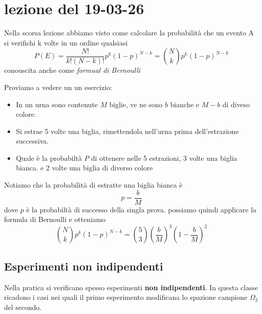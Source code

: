\documentclass[11pt,a4paper]{article}
\begin{document}
\section{lezione del 19-03-26}
Nella scorsa lezione abbiamo visto come calcolare la probabilità che un evento A 
si verifichi k volte in un ordine qualsiasi
\[
    P(E) = \frac{N!}{k!(N - k)!}p^k(1 - p)^{N - k} = \binom{N}{k}p^k(1 - p)^{N - k}
\]
conouscita anche come \textit{formual di Bernoulli}

Proviamo a vedere un un esercizio: 
\begin{itemize}
    \item In un urna sono contenute $M$ biglie, ve ne sono $b$ bianche e $M - b$ di diveso colore.
    \item Si estrae 5  volte una biglia, rimettendola nell'urna prima dell'estrazione successiva.
    \item Quale è la probabiltà $P$ di ottenere nelle 5 estrazioni, 3 volte una biglia bianca.
        e 2 volte una biglia di diverso colore
\end{itemize}
Notiamo che la probabilità di estratte una biglia bianca è
\[
    p = \frac{b}{M}
\]
dove $p$ è la probabiltà di successo della singla prova.
possiamo quindi applicare la formula di Bernoulli e otteniamo
\[
    \binom{N}{k}p^k(1 - p)^{N-k} = \binom{5}{3}\left ( \frac{b}{M} \right)^3\left ( 1 -\frac{b}{M}\right)^2
\]
\subsection{Esperimenti non indipendenti}\label{sub:Esperimenti non indipendenti} %
Nella pratica si verificano spesso esperimenti \textbf{non indipendenti}. In questa
classe ricadono i casi nei quali il primo esperimento modificana lo spazione campione 
$\Omega_2$ del secondo. \\ 
\end{document}
